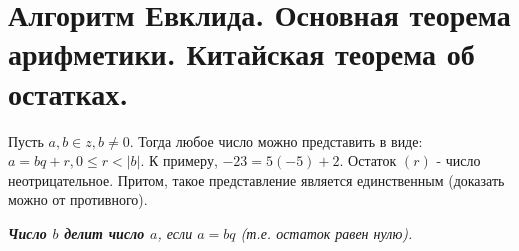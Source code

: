 \documentclass[a4paper, 12pt]{report}
\begin{document}
	
	
	
	
	
	
	
	
	\section{Алгоритм Евклида. Основная теорема арифметики. Китайская теорема об остатках.}
	
	Пусть $a, b \in z, b \ne 0$. Тогда любое число можно представить в виде: $a = bq + r, 0 \leq r < |b|$. К примеру, $-23 = 5(-5) + 2$. Остаток $(r)$ - число неотрицательное. Притом, такое представление является единственным (доказать можно от противного).
	
	\textit{\textbf{Число $b$ делит число $a$}, если $a = bq$ (т.е. остаток равен нулю).}
	
\end{document}
